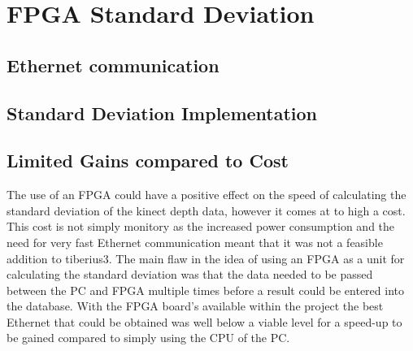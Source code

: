 \section{FPGA Standard Deviation}

\subsection{Ethernet communication}

\subsection{Standard Deviation Implementation}

\subsection{Limited Gains compared to Cost}
The use of an \gls{FPGA} could have a positive effect on the speed of calculating the standard deviation of the kinect depth data, however it comes at to high a cost. This cost is not simply monitory as the increased power consumption and the need for very fast Ethernet communication meant that it was not a feasible addition to \gls{tiberius3}. The main flaw in the idea of using an \gls{FPGA} as a unit for calculating the standard deviation was that the data needed to be passed between the PC and \gls{FPGA} multiple times before a result could be entered into the database. With the \gls{FPGA} board's available within the project the best Ethernet that could be obtained was well below a viable level for a speed-up to be gained compared to simply using the CPU of the PC.

\pagestyle{stuart}













